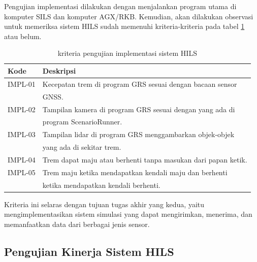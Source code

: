 Pengujian implementasi dilakukan dengan menjalankan program utama di komputer
SILS dan komputer AGX/RKB. Kemudian, akan dilakukan observasi untuk memeriksa
sistem HILS sudah memenuhi kriteria-kriteria pada tabel
\ref{chapter-4-tbl-impl-criteria} atau belum.
\begin{table}[!htbp]
	\begin{center}
		\begin{tabular}{|l|l|}
			\hline
			\textbf{Kode} & \textbf{Deskripsi}                                     \\
			\hline
			IMPL-01       & Kecepatan trem di program GRS sesuai dengan bacaan
			sensor                                                                 \\
			              & GNSS.                                                  \\
			\hline
			IMPL-02       & Tampilan kamera di program GRS sesuai dengan yang
			ada di                                                                 \\
			              & program ScenarioRunner.                                \\
			\hline
			IMPL-03       & Tampilan lidar di program GRS menggambarkan
			objek-objek                                                            \\
			              & yang ada di sekitar trem.                              \\
			\hline
			IMPL-04       & Trem dapat maju atau berhenti tanpa masukan dari
			papan ketik.                                                           \\
			\hline
			IMPL-05       & Trem maju ketika mendapatkan kendali maju dan berhenti \\
			              & ketika mendapatkan kendali berhenti.                   \\
			\hline
		\end{tabular}
	\end{center}

	\caption{kriteria pengujian implementasi sistem HILS}
	\label{chapter-4-tbl-impl-criteria}
\end{table}

Kriteria ini selaras dengan tujuan tugas akhir yang kedua, yaitu
mengimplementasikan sistem simulasi yang dapat mengirimkan, menerima, dan
memanfaatkan data dari berbagai jenis sensor.

\subsection{Pengujian Kinerja Sistem HILS}

